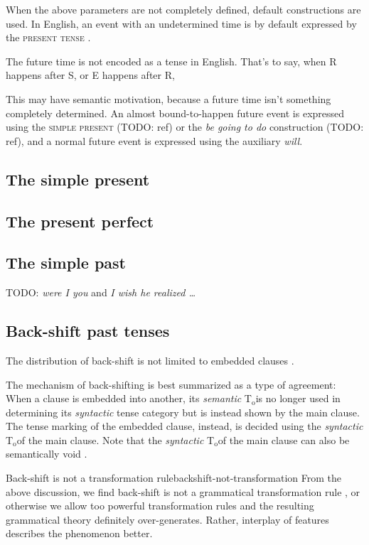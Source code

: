\documentclass[UTF8, a4paper, oneside, scheme=plain]{ctexrep}
\newcommand*{\citepage}[1]{p.~{#1}}
\newcommand*{\citepages}[1]{pp.~{#1}}
\newcommand{\corpus}[1]{\emph{#1}}
\newcommand{\orientationtime}{T$_{\text{o}}$}
\newcommand{\category}[1]{\textsc{#1}}
\begin{document}
When the above parameters are not completely defined,
default constructions are used.
In English, an event with an undetermined time 
is by default expressed by the \category{present tense} \citep[\citepage{129}]{cgel}.

The future time is not encoded as a tense in English.
That's to say, when R happens after S, or E happens after R,

This may have semantic motivation,
because a future time isn't something completely determined.
An almost bound-to-happen future event 
is expressed using the \category{simple present} (TODO: ref)
or the \corpus{be going to do} construction (TODO: ref),
and a normal future event is expressed using the auxiliary \corpus{will}.

\subsection{The simple present}

\subsection{The present perfect}

\subsection{The simple past}

TODO: \corpus{were I you} and \corpus{I wish he realized \dots} \citep[\citepage{153}, {[15]}]{cgel}

\subsection{Back-shift past tenses}

The distribution of back-shift is not limited to embedded clauses \citep[\citepages{152-154}]{cgel}.

The mechanism of back-shifting is best summarized as a type of agreement:
When a clause is embedded into another,
its \emph{semantic} \orientationtime is no longer used in determining its \emph{syntactic} tense category
but is instead shown by the main clause.
The tense marking of the embedded clause,
instead, is decided using the \emph{syntactic} \orientationtime of the main clause.
Note that the \emph{syntactic} \orientationtime of the main clause 
can also be semantically void \citep[\citepage{154}, {[15i]}]{cgel}.

\begin{theorybox}{Back-shift is not a transformation rule}{backshift-not-transformation}
    From the above discussion, 
    we find back-shift is not a grammatical transformation rule
    \citep[\citepage{155}]{cgel},
    or otherwise we allow too powerful transformation rules 
    and the resulting grammatical theory definitely over-generates.
    Rather, interplay of features describes the phenomenon better.
\end{theorybox}
\end{document}
